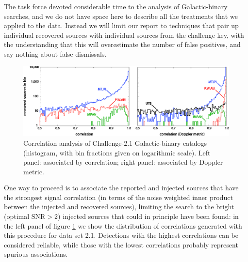 \documentclass{iopart}
\begin{document}
The task force devoted considerable time to the analysis of Galactic-binary searches, and we do not have space here to describe all the treatments that we applied to the data. Instead we will limit our report to techniques that pair up individual recovered sources with individual sources from the challenge key, with the understanding that this will overestimate the number of false positives, and say nothing about false dismissals.
%
\begin{figure}
\includegraphics[width=\textwidth]{Correlations-2}
\vspace{-18pt}
\caption{Correlation analysis of Challenge-2.1 Galactic-binary catalogs (histogram, with bin fractions given on logarithmic scale).  Left panel: associated by correlation; right panel: associated by Doppler metric.\label{fig:correlation}}
\vspace{-6pt}
\end{figure}

One way to proceed is to associate the reported and injected sources that have the strongest signal correlation (in terms of the
noise weighted inner product between the injected and recovered sources), limiting the search to the bright
(optimal $\mathrm{SNR} > 2$) injected sources that could in principle have been found: in the left panel of figure \ref{fig:correlation} we show the distribution of correlations generated with this procedure for data set 2.1.
Detections with the highest correlations can be considered reliable, while those with the lowest correlations probably
represent spurious associations.
\end{document}
